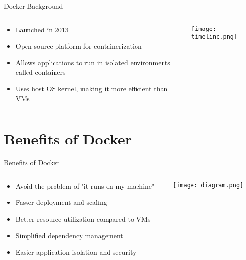 \documentclass{beamer}
\begin{document}
\begin{frame}{Docker Background}

    \begin{columns}[T]
        \begin{column}{0.4\textwidth}
            \begin{itemize}
                \item Launched in 2013
                \item Open-source platform for containerization
                \item Allows applications to run in isolated environments called containers
                \item Uses host OS kernel, making it more efficient than VMs
            \end{itemize}
        \end{column}
        \begin{column}{0.6\textwidth}
            \texttt{[image: timeline.png]}
        \end{column}
    \end{columns}
\end{frame}

\section{Benefits of Docker}

\begin{frame}{Benefits of Docker}

    \begin{columns}[T]
        \begin{column}{0.4\textwidth}
            \begin{itemize}
                \item Avoid the problem of "it runs on my machine"
                \item Faster deployment and scaling
                \item Better resource utilization compared to VMs
                \item Simplified dependency management
                \item Easier application isolation and security
            \end{itemize}
        \end{column}
        \begin{column}{0.6\textwidth}
            \texttt{[image: diagram.png]}
        \end{column}
    \end{columns}
\end{frame}
\end{document}
